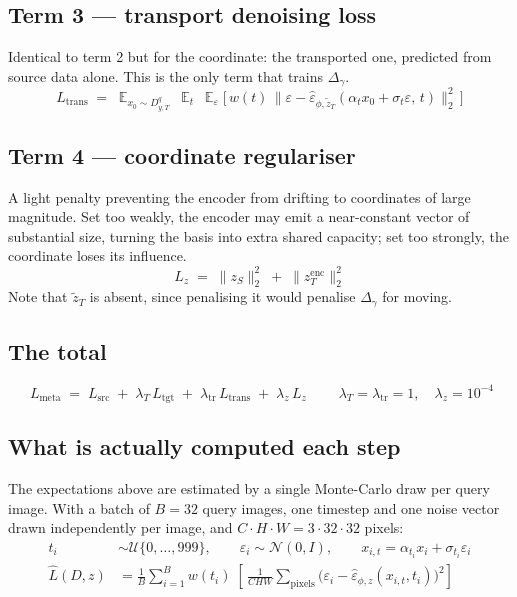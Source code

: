 \documentclass[11pt]{article}
\newcommand{\epshat}{\hat{\varepsilon}}
\newcommand{\zS}{z_{S}}
\newcommand{\zencT}{z^{\mathrm{enc}}_{T}}
\newcommand{\ztilT}{\tilde{z}_{T}}
\newcommand{\Dqt}{D^{q}_{y,T}}
\begin{document}
\subsection{Term 3 --- transport denoising loss}

Identical to term 2 but for the coordinate: the transported one, predicted from source data alone.
This is the only term that trains $\Delta_\gamma$.
\begin{equation}
L_{\mathrm{trans}} \;=\;
\mathop{\mathbb{E}}_{x_0\sim \Dqt}\ \mathop{\mathbb{E}}_{t}\ \mathop{\mathbb{E}}_{\varepsilon}
\Big[\, w(t)\, \big\| \varepsilon - \epshat_{\phi,\ztilT}(\alpha_t x_0+\sigma_t\varepsilon,\, t) \big\|_2^2 \,\Big]
\end{equation}

\subsection{Term 4 --- coordinate regulariser}

A light penalty preventing the encoder from drifting to coordinates of large magnitude. Set too
weakly, the encoder may emit a near-constant vector of substantial size, turning the basis into
extra shared capacity; set too strongly, the coordinate loses its influence.
\begin{equation}
L_{z} \;=\; \|\zS\|_2^2 \;+\; \|\zencT\|_2^2
\end{equation}
Note that $\ztilT$ is absent, since penalising it would penalise $\Delta_\gamma$ for moving.

\subsection{The total}

\begin{equation}
\boxed{\;
L_{\mathrm{meta}} \;=\; L_{\mathrm{src}}
  \;+\; \lambda_{T}\,L_{\mathrm{tgt}}
  \;+\; \lambda_{\mathrm{tr}}\,L_{\mathrm{trans}}
  \;+\; \lambda_{z}\,L_{z} \;}
\qquad \lambda_{T}=\lambda_{\mathrm{tr}}=1,\quad \lambda_{z}=10^{-4}
\end{equation}

\subsection{What is actually computed each step}

The expectations above are estimated by a single Monte-Carlo draw per query image. With a batch of
$B=32$ query images, one timestep and one noise vector drawn independently per image, and
$C\!\cdot\!H\!\cdot\!W = 3\cdot32\cdot32$ pixels:
\begin{align}
t_i &\sim \mathcal{U}\{0,\dots,999\}, \qquad
\varepsilon_i \sim \mathcal{N}(0,I), \qquad
x_{i,t} = \alpha_{t_i} x_i + \sigma_{t_i}\varepsilon_i \\[4pt]
\widehat{L}(D,z) &= \frac{1}{B}\sum_{i=1}^{B} w(t_i)\;
  \left[\, \frac{1}{C H W}\sum_{\text{pixels}}
  \big( \varepsilon_i - \epshat_{\phi,z}(x_{i,t},t_i) \big)^2 \right]
\end{align}
\end{document}
